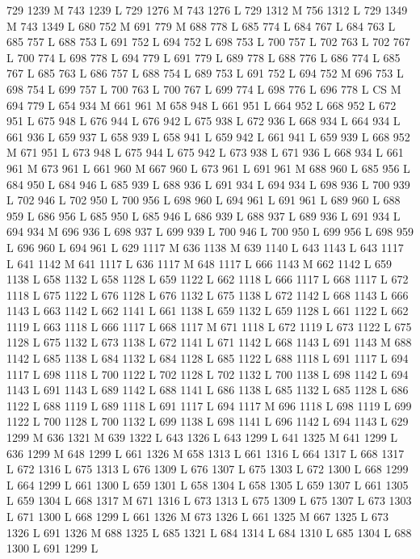 {{{{{{{{{{{{{{{{{{{{{{{{{{{{{{729 1239 M 743 1239 L
729 1276 M 743 1276 L
729 1312 M 756 1312 L
729 1349 M 743 1349 L
680 752 M 691 779 M 688 778 L
685 774 L
684 767 L
684 763 L
685 757 L
688 753 L
691 752 L
694 752 L
698 753 L
700 757 L
702 763 L
702 767 L
700 774 L
698 778 L
694 779 L
691 779 L
689 778 L
688 776 L
686 774 L
685 767 L
685 763 L
686 757 L
688 754 L
689 753 L
691 752 L
694 752 M 696 753 L
698 754 L
699 757 L
700 763 L
700 767 L
699 774 L
698 776 L
696 778 L
CS M
694 779 L
654 934 M 661 961 M 658 948 L
661 951 L
664 952 L
668 952 L
672 951 L
675 948 L
676 944 L
676 942 L
675 938 L
672 936 L
668 934 L
664 934 L
661 936 L
659 937 L
658 939 L
658 941 L
659 942 L
661 941 L
659 939 L
668 952 M 671 951 L
673 948 L
675 944 L
675 942 L
673 938 L
671 936 L
668 934 L
661 961 M 673 961 L
661 960 M 667 960 L
673 961 L
691 961 M 688 960 L
685 956 L
684 950 L
684 946 L
685 939 L
688 936 L
691 934 L
694 934 L
698 936 L
700 939 L
702 946 L
702 950 L
700 956 L
698 960 L
694 961 L
691 961 L
689 960 L
688 959 L
686 956 L
685 950 L
685 946 L
686 939 L
688 937 L
689 936 L
691 934 L
694 934 M 696 936 L
698 937 L
699 939 L
700 946 L
700 950 L
699 956 L
698 959 L
696 960 L
694 961 L
629 1117 M 636 1138 M 639 1140 L
643 1143 L
643 1117 L
641 1142 M 641 1117 L
636 1117 M 648 1117 L
666 1143 M 662 1142 L
659 1138 L
658 1132 L
658 1128 L
659 1122 L
662 1118 L
666 1117 L
668 1117 L
672 1118 L
675 1122 L
676 1128 L
676 1132 L
675 1138 L
672 1142 L
668 1143 L
666 1143 L
663 1142 L
662 1141 L
661 1138 L
659 1132 L
659 1128 L
661 1122 L
662 1119 L
663 1118 L
666 1117 L
668 1117 M 671 1118 L
672 1119 L
673 1122 L
675 1128 L
675 1132 L
673 1138 L
672 1141 L
671 1142 L
668 1143 L
691 1143 M 688 1142 L
685 1138 L
684 1132 L
684 1128 L
685 1122 L
688 1118 L
691 1117 L
694 1117 L
698 1118 L
700 1122 L
702 1128 L
702 1132 L
700 1138 L
698 1142 L
694 1143 L
691 1143 L
689 1142 L
688 1141 L
686 1138 L
685 1132 L
685 1128 L
686 1122 L
688 1119 L
689 1118 L
691 1117 L
694 1117 M 696 1118 L
698 1119 L
699 1122 L
700 1128 L
700 1132 L
699 1138 L
698 1141 L
696 1142 L
694 1143 L
629 1299 M 636 1321 M 639 1322 L
643 1326 L
643 1299 L
641 1325 M 641 1299 L
636 1299 M 648 1299 L
661 1326 M 658 1313 L
661 1316 L
664 1317 L
668 1317 L
672 1316 L
675 1313 L
676 1309 L
676 1307 L
675 1303 L
672 1300 L
668 1299 L
664 1299 L
661 1300 L
659 1301 L
658 1304 L
658 1305 L
659 1307 L
661 1305 L
659 1304 L
668 1317 M 671 1316 L
673 1313 L
675 1309 L
675 1307 L
673 1303 L
671 1300 L
668 1299 L
661 1326 M 673 1326 L
661 1325 M 667 1325 L
673 1326 L
691 1326 M 688 1325 L
685 1321 L
684 1314 L
684 1310 L
685 1304 L
688 1300 L
691 1299 L
}}}}}}}}}}}}}}}}}}}}}}}}}}}}}}
